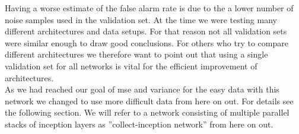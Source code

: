 Having a worse estimate of the false alarm rate is due to the a lower number of noise samples used in the validation set. At the time we were testing many different architectures and data setups. For that reason not all validation sets were similar enough to draw good conclusions. For others who try to compare different architectures we therefore want to point out that using a single validation set for all networks is vital for the efficient improvement of architectures.\smallskip\\%
As we had reached our goal of \gls{mse} and variance for the easy data with this network we changed to use more difficult data from here on out. For details see the following section. We will refer to a network consisting of multiple parallel stacks of inception layers as ''collect-inception network'' from here on out.
